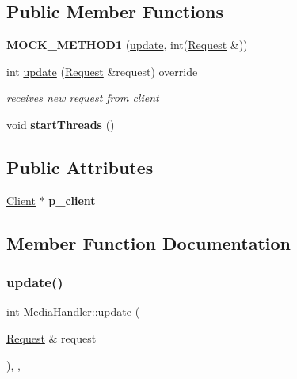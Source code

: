 \subsection*{Public Member Functions}
\begin{DoxyCompactItemize}
\item 
\mbox{\label{classMockObserver_a9e5d475e1c41dff9f789c8c9daf50de8}} 
{\bfseries M\+O\+C\+K\+\_\+\+M\+E\+T\+H\+O\+D1} (\hyperlink{classMediaHandler_ae0c5fa9c02ac287d2e04699d67a02eaf}{update}, int(\hyperlink{classRequest}{Request} \&))
\item 
int \hyperlink{classMediaHandler_ae0c5fa9c02ac287d2e04699d67a02eaf}{update} (\hyperlink{classRequest}{Request} \&request) override
\begin{DoxyCompactList}\small\item\em receives new request from client \end{DoxyCompactList}\item 
\mbox{\label{classMediaHandler_a2cb06c3f6c1bd1af74ab4692723c89f6}} 
void {\bfseries start\+Threads} ()
\end{DoxyCompactItemize}
\subsection*{Public Attributes}
\begin{DoxyCompactItemize}
\item 
\mbox{\label{classMediaHandler_aba19c2fd2e904d928ce5914f9dbf8f38}} 
\hyperlink{classClient}{Client} $\ast$ {\bfseries p\+\_\+client}
\end{DoxyCompactItemize}


\subsection{Member Function Documentation}
\mbox{\label{classMediaHandler_ae0c5fa9c02ac287d2e04699d67a02eaf}} 
\subsubsection{\texorpdfstring{update()}{update()}}
{\footnotesize\ttfamily int Media\+Handler\+::update (\begin{DoxyParamCaption}\item[{\hyperlink{classRequest}{Request} \&}]{request }\end{DoxyParamCaption})\hspace{0.3cm}{\ttfamily [override]}, {\ttfamily [virtual]}, {\ttfamily [inherited]}}



